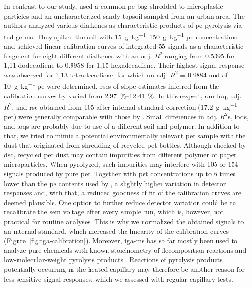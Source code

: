 In contrast to our study, \citet{DumichenFast2017} used a common \ac{pe} bag shredded to microplastic particles and an uncharacterized sandy topsoil sampled from an urban area. The authors analyzed various dialkenes as characteristic products of \ac{pe} pyrolysis via \ac{ted-gc-ms}. They spiked the soil with \SIrange[range-phrase = { to }]{15}{150}{\gram\per\kilo\gram} \ac{pe} concentrations and achieved linear calibration curves of integrated \SI{55}{\mz} signals as a characteristic fragment for eight different dialkenes with an adj. $R^2$ ranging from \num{0.5395} for 1,11-dodecadiene to \num{0.9958} for 1,15-hexadecadiene. Their highest signal response was observed for 1,13-tetradecadiene, for which an adj. $R^2$ = \num{0.9884} and  of \SI{10}{\gram\per\kilo\gram} \ac{pe} were determined.
\Acp{rse} of slope estimates inferred from the calibration curves by \citet{DumichenAnalysis2015} varied from \SIrange[range-phrase = { to }]{2.97}{12.41}{\percent}. In this respect, our \ac{loq}, adj. $R^2$, and \ac{rse} obtained from \SI{105}{\mz} after internal standard correction (\SI{17.2}{\gram\per\kilo\gram} \ac{pet}) were generally comparable with those by \citet{DumichenAnalysis2015}.
Small differences in adj. $R^2$s, \acp{lod}, and \acp{loq} are probably due to use of a different soil and polymer. In addition to that, we tried to mimic a potential environmentally relevant \ac{pet} sample with the dust that originated from shredding of recycled \ac{pet} bottles.
Although checked by \ac{dsc}, recycled \ac{pet} dust may contain impurities from different polymer or paper microparticles.
When pyrolyzed, such impurities may interfere with \num{105} or \SI{154}{\mz} signals produced by pure \ac{pet}.
Together with \ac{pet} concentrations up to \num{6} times lower than the \ac{pe} contents used by \citet{DumichenAnalysis2015}, a slightly higher variation in detector responses and, with that, a reduced goodness of fit of the calibration curves are deemed plausible. One option to further reduce detector variation could be to recalibrate the \ac{sem} voltage after every sample run, which is, however, not practical for routine analyses. This is why we normalized the obtained signals to an internal standard, which increased the linearity of the calibration curves (Figure~\ref{fig:tga-calibration}).
Moreover, \ac{tga-ms} has so far mostly been used to analyze pure chemicals with known stoichiometry of decomposition reactions and low-molecular-weight pyrolysis products \citep{HotovaQuantitative2016}. Reactions of pyrolysis products potentially occurring in the heated capillary may therefore be another reason for less sensitive signal responses, which we assessed with regular capillary tests.

